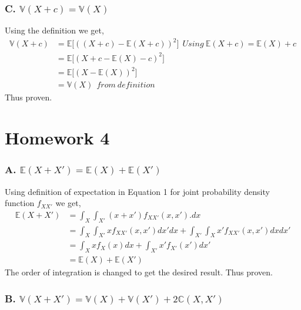 \documentclass{article}
\begin{document}
\subsubsection*{C. $\mathbb{V}(X+c)=\mathbb{V}(X)$}
Using the definition we get,
\begin{align*}
    \mathbb{V}(X+c) &= \mathbb{E}\big[((X+c)-\mathbb{E}(X+c))^2 \big]\ \ Using\ \mathbb{E}(X+c) = \mathbb{E}(X) + c\\
     &=  \mathbb{E}\big[( X+c -\mathbb{E}(X)-c)^2 \big] \\
     & = \mathbb{E}\big[( X-\mathbb{E}(X))^2 \big]\\
     &=  \mathbb{V}(X) \ \ from\ definition
\end{align*} 
Thus proven.

\section*{Homework 4}
\subsubsection*{A. $\mathbb{E}(X+X')=\mathbb{E}(X) + \mathbb{E}(X') $}
Using definition of expectation in Equation 1 for joint probability density function $f_{XX'}$ we get,
\begin{align*}
    \mathbb{E}(X+X') &= \int_{X}\int_{X'}(x+x')f_{XX'}(x,x') . dx\\
    &= \int_{X}\int_{X'} x f_{XX'}(x,x') dx' dx + \int_{X'}\int_{X} x' f_{XX'}(x,x') dx dx'\\
    &= \int_{X} x f_{X}(x) dx + \int_{X'} x' f_{X'}(x') dx'\\
    &= \mathbb{E}(X) + \mathbb{E}(X') 
\end{align*}
The order of integration is changed to get the desired result. Thus proven.

\subsubsection*{B. $\mathbb{V}(X+X')=\mathbb{V}(X) + \mathbb{V}(X') + 2\mathbb{C}(X,X') $}
\end{document}
